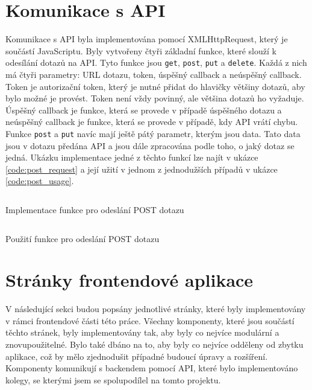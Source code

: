 \section{Komunikace s API}
Komunikace s API byla implementována pomocí XMLHttpRequest, který je součástí JavaScriptu. Byly vytvořeny čtyři základní funkce, které slouží k odesílání dotazů na API. Tyto funkce jsou \texttt{get}, \texttt{post}, \texttt{put} a \texttt{delete}. Každá z nich má čtyři parametry: URL dotazu, token, úspěšný callback a neúspěšný callback. Token je autorizační token, který je nutné přidat do hlavičky většiny dotazů, aby bylo možné je provést. Token není vždy povinný, ale většina dotazů ho vyžaduje. Úspěšný callback je funkce, která se provede v případě úspěšného dotazu a neúspěšný callback je funkce, která se provede v případě, kdy API vrátí chybu. Funkce \texttt{post} a \texttt{put} navíc mají ještě pátý parametr, kterým jsou data. Tato data jsou v dotazu předána API a jsou dále zpracována podle toho, o jaký dotaz se jedná. Ukázku implementace jedné z těchto funkcí lze najít v ukázce \ref{code:post_request} a její užití v jednom z jednodužších případů v ukázce \ref{code:post_usage}.

\begin{listing}[H]
  \inputminted[breaklines]{typescript}{resources/code/post_request.ts}
  \caption{Implementace funkce pro odeslání POST dotazu}
  \label{code:post_request}
\end{listing}

\begin{listing}[H]
  \inputminted[breaklines]{typescript}{resources/code/post_usage.ts}
  \caption{Použití funkce pro odeslání POST dotazu}
  \label{code:post_usage}
\end{listing}

\section{Stránky frontendové aplikace}
V následující sekci budou popsány jednotlivé stránky, které byly implementovány v rámci frontendové části této práce. Všechny komponenty, které jsou součástí těchto stránek, byly implementovány tak, aby byly co nejvíce modulární a znovupoužitelné. Bylo také dbáno na to, aby byly co nejvíce odděleny od zbytku aplikace, což by mělo zjednodušit případné budoucí úpravy a rozšíření. Komponenty komunikují s backendem pomocí API, které bylo implementováno kolegy, se kterými jsem se spolupodílel na tomto projektu.

